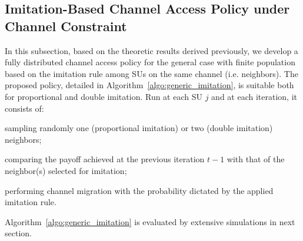 \documentclass[12pt, onecolumn]{IEEEtran}
\theoremstyle{plain}
\theoremstyle{definition}
\begin{document}
\subsection{Imitation-Based Channel Access Policy under Channel Constraint}
\label{subsec:algorithm}

In this subsection, based on the theoretic results derived previously, we develop a fully distributed channel access policy for the general case with finite population based on the imitation rule among SUs on the same channel (i.e. neighbors). The proposed policy, detailed in Algorithm~\ref{algo:generic_imitation}, is suitable both for proportional and double imitation. Run at each SU $j$ and at each iteration, it consists of:
\begin{compactitem}
\item sampling randomly one (proportional imitation) or two (double imitation) neighbors;
\item comparing the payoff achieved at the previous iteration $t-1$ with that of the neighbor(s) selected for imitation;
\item performing channel migration with the probability dictated by the applied imitation rule.
\end{compactitem}
Algorithm~\ref{algo:generic_imitation} is evaluated by extensive simulations in next section.

\begin{comment}

\begin{algorithm}
\caption{Imitation-based Spectrum Access Policy under Channel Constraint: executed at each SU $j$}
\begin{algorithmic}[1]
\STATE \textbf{Initialization:} set the imitation factor $\sigma$, the imitation threshold $\epsilon_U$ and the learning rate $\epsilon(t)$
\STATE Randomly choose a channel for the first two iterations $t=0,1$
\WHILE{for each iteration $t\ge 2$}
        \STATE With probability $1-\epsilon(t)$
            \STATE \hspace{0.25cm} Perform imitation in PISAP or DISAP on the same channel
        \STATE With probability $\epsilon(t)$
            \STATE \hspace{0.25cm} Switch to a random channel
        \STATE $t \leftarrow t+1$:
\ENDWHILE
\end{algorithmic}
\label{algo:generic_imitation}
\end{algorithm}

\end{comment}
\end{document}
